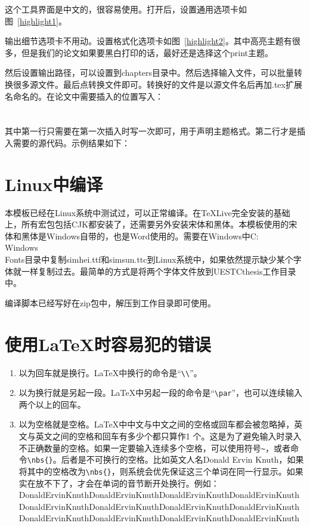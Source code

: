 这个工具界面是中文的，很容易使用。打开后，设置通用选项卡如图~\ref{highlight1}。

输出细节选项卡不用动。设置格式化选项卡如图~\ref{highlight2}。其中高亮主题有很多，但是我们的论文如果要黑白打印的话，最好还是选择这个print主题。

然后设置输出路径，可以设置到chapters目录中。然后选择输入文件，可以批量转换很多源文件。最后点转换文件即可。转换好的文件是以源文件名后再加.tex扩展名命名的。在论文中需要插入的位置写入：\\
\verb||\\
\verb||\\
其中第一行只需要在第一次插入时写一次即可，用于声明主题格式。第二行才是插入需要的源代码。示例结果如下：


\section{Linux中编译}
本模板已经在Linux系统中测试过，可以正常编译。在TeXLive完全安装的基础上，所有宏包包括CJK都安装了，还需要另外安装宋体和黑体。本模板使用的宋体和黑体是Windows自带的，也是Word使用的。需要在Windows中C:\\Windows\\Fonts目录中复制simhei.ttf和simsun.ttc到Linux系统中，如果依然提示缺少某个字体就一样复制过去。最简单的方式是将两个字体文件放到UESTCthesis工作目录中。

编译脚本已经写好在zip包中，解压到工作目录即可使用。
\section{使用\LaTeX{}时容易犯的错误}
\begin{enumerate}
\item 以为回车就是换行。\LaTeX{}中换行的命令是“\verb|\\|”。
\item 以为换行就是另起一段。\LaTeX{}中另起一段的命令是“\verb|\par|”，也可以连续输入两个以上的回车。
\item 以为空格就是空格。\LaTeX{}中中文与中文之间的空格或回车都会被忽略掉，英文与英文之间的空格和回车有多少个都只算作1 个。这是为了避免输入时录入不正确数量的空格。如果一定要输入连续多个空格，可以使用符号\verb|~|，或者命令\verb|\nbs{}|。后者是不可换行的空格。比如英文人名Donald Ervin Knuth，如果将其中的空格改为\verb|\nbs{}|，则系统会优先保证这三个单词在同一行显示。如果实在放不下了，才会在单词的音节断开处换行。例如：
    Donald\nbs{}Ervin\nbs{}Knuth\nbs{}Donald\nbs{}Ervin\nbs{}Knuth\nbs{}Donald\nbs{}Ervin\nbs{}Knuth\nbs{}Donald\nbs{}Ervin\nbs{}Knuth\nbs{}Donald\nbs{}Ervin\nbs{}Knuth\nbs{}Donald\nbs{}Ervin\nbs{}Knuth\nbs{}Donald\nbs{}Ervin\nbs{}Knuth\nbs{}Donald\nbs{}Ervin\nbs{}Knuth\nbs{}Donald\nbs{}Ervin\nbs{}Knuth\nbs{}Donald\nbs{}Ervin\nbs{}Knuth\nbs{}Donald\nbs{}Ervin\nbs{}Knuth\nbs{}Donald\nbs{}Ervin\nbs{}Knuth\nbs{}
\end{enumerate}

